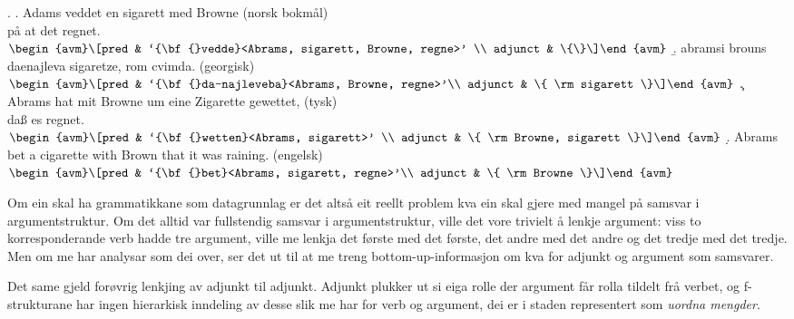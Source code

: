 \documentclass[11pt,a4paper,oneside,draft]{book}
\begin{document}
{\avmoptions{}
\ex. \label{vedde}
\a. Adams veddet en sigarett med Browne \hfill{} (norsk bokmål)\\ på at det regnet.\\
    $\\\begin{avm}\[pred & `{\bf{}vedde}<Abrams, sigarett, Browne, regne>' \\
                 adjunct & \{\}\]\end{avm}\\$
\b. abramsi brouns daenajleva sigaretze, rom cvimda. \hfill{} (georgisk)\\
    $\\\begin{avm}\[pred &  `{\bf{}da-najleveba}<Abrams, Browne, regne>'\\
    adjunct &  \{ \rm sigarett \}\]\end{avm}\\$ 
\c. Abrams hat mit Browne um eine Zigarette gewettet, \hfill{}(tysk)\\
    daß es regnet.\\
    $\\\begin{avm}\[pred & `{\bf{}wetten}<Abrams, sigarett>' \\
                  adjunct & \{ \rm Browne, sigarett \}\]\end{avm}\\$
\d. Abrams bet a cigarette with Brown that it was raining. \hfill{}(engelsk)\\
    $\\\begin{avm}\[pred & `{\bf{}bet}<Abrams, sigarett, regne>'\\
                  adjunct & \{ \rm Browne \}\]\end{avm}$

}

Om ein skal ha grammatikkane som datagrunnlag er det altså eit reellt
problem kva ein skal gjere med mangel på samsvar i
argumentstruktur. Om det alltid var fullstendig samsvar i
argumentstruktur, ville det vore trivielt å lenkje argument: viss to
korresponderande verb hadde tre argument, ville me lenkja det første
med det første, det andre med det andre og det tredje med det
tredje. Men om me har analysar som dei over, ser det ut til at me
treng bottom-up-informasjon om kva for adjunkt og argument som
samsvarer.

Det same gjeld forøvrig lenkjing av adjunkt til adjunkt. Adjunkt
plukker ut si eiga rolle der argument får rolla tildelt frå verbet, og
f-strukturane har ingen hierarkisk inndeling av desse slik me har for
verb og argument, dei er i staden representert som \emph{uordna mengder}.
\end{document}
